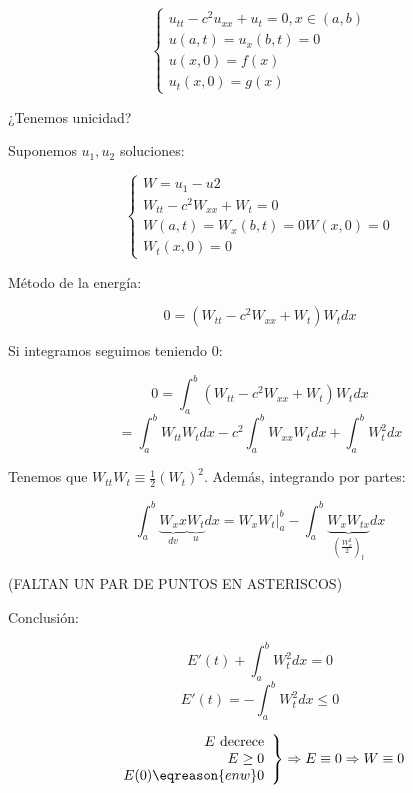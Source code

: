 			\begin{problem}

				\[\begin{cases}
					u_{tt} - c^2u_{xx} + u_t = 0, x \in (a,b)\\
					u(a,t) = u_x (b,t) = 0\\
					u(x,0) = f(x) \\
					u_t(x,0) = g(x)
				\end{cases}\]

				¿Tenemos unicidad?

				\solution

				Suponemos $u_1,u_2$ soluciones:

				\[ \begin{cases} W = u_1 - u2 \\
				W_{tt} - c^2 W_{xx} + W_t = 0 \\
				W(a,t) = W_x (b,t) = 0
				W(x,0) = 0\\
				W_t (x,0) = 0
				\end{cases}\]

				Método de la energía:

				\[ 0 = (W_{tt} - c^2 W_{xx} + W_t) W_t dx\]

				Si integramos seguimos teniendo 0:

				\[ 0 = \int_a^b (W_{tt} - c^2 W_{xx} + W_t) W_t dx\]
				\[ = \int_a^b W_{tt} W_t dx - c^2 \int^b_a W_{xx} W_t dx + \int_{a}^b W^2_t dx  \]

				Tenemos que $W_{tt}W_t \equiv \frac{1}{2} (W_t)^2 $. Además, integrando por partes:

				\[ \int_a^b \underbrace{W_xx}_{dv} \underbrace{W_t}_{u} dx = W_x W_t |_a^b - \int_a^b \underbrace{W_x W_{tx}}_{(\frac{W_x^2}{2})_t} dx \]

				(FALTAN UN PAR DE PUNTOS EN ASTERISCOS) %

				Conclusión:

				\[ E'(t) + \int_a^b W_t^2 dx = 0\]
				\[ E'(t) = -\int_a^b W_t^2 dx \leq 0 \]

				\[ \left. \begin{array}{r}
					E \text{ decrece} \\
					E \geq 0 \\
					E(0) \eqreason{en w} 0 \end{array} \right\} \Rightarrow E \equiv 0 \Rightarrow W \equiv 0 \]

			\end{problem}

